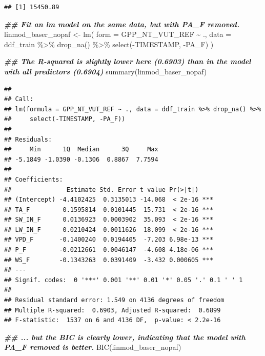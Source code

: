 \documentclass[
]{book}
\newenvironment{Shaded}{\begin{snugshade}}{\end{snugshade}}
\newcommand{\AttributeTok}[1]{\textcolor[rgb]{0.77,0.63,0.00}{#1}}
\newcommand{\DocumentationTok}[1]{\textcolor[rgb]{0.56,0.35,0.01}{\textbf{\textit{#1}}}}
\newcommand{\FunctionTok}[1]{\textcolor[rgb]{0.00,0.00,0.00}{#1}}
\newcommand{\NormalTok}[1]{#1}
\newcommand{\OtherTok}[1]{\textcolor[rgb]{0.56,0.35,0.01}{#1}}
\newcommand{\SpecialCharTok}[1]{\textcolor[rgb]{0.00,0.00,0.00}{#1}}
\begin{document}
\begin{verbatim}
## [1] 15450.89
\end{verbatim}

\begin{Shaded}
\begin{Highlighting}[]
\DocumentationTok{\#\# Fit an lm model on the same data, but with PA\_F removed.}
\NormalTok{linmod\_baser\_nopaf }\OtherTok{\textless{}{-}} \FunctionTok{lm}\NormalTok{(}
  \AttributeTok{form =}\NormalTok{ GPP\_NT\_VUT\_REF }\SpecialCharTok{\textasciitilde{}}\NormalTok{ ., }
  \AttributeTok{data =}\NormalTok{ ddf\_train }\SpecialCharTok{\%\textgreater{}\%} 
    \FunctionTok{drop\_na}\NormalTok{() }\SpecialCharTok{\%\textgreater{}\%} 
    \FunctionTok{select}\NormalTok{(}\SpecialCharTok{{-}}\NormalTok{TIMESTAMP, }\SpecialCharTok{{-}}\NormalTok{PA\_F)}
\NormalTok{)}

\DocumentationTok{\#\# The R{-}squared is slightly lower here (0.6903) than in the model with all predictors (0.6904)}
\FunctionTok{summary}\NormalTok{(linmod\_baser\_nopaf)}
\end{Highlighting}
\end{Shaded}

\begin{verbatim}
## 
## Call:
## lm(formula = GPP_NT_VUT_REF ~ ., data = ddf_train %>% drop_na() %>% 
##     select(-TIMESTAMP, -PA_F))
## 
## Residuals:
##     Min      1Q  Median      3Q     Max 
## -5.1849 -1.0390 -0.1306  0.8867  7.7594 
## 
## Coefficients:
##               Estimate Std. Error t value Pr(>|t|)    
## (Intercept) -4.4102425  0.3135013 -14.068  < 2e-16 ***
## TA_F         0.1595814  0.0101445  15.731  < 2e-16 ***
## SW_IN_F      0.0136923  0.0003902  35.093  < 2e-16 ***
## LW_IN_F      0.0210424  0.0011626  18.099  < 2e-16 ***
## VPD_F       -0.1400240  0.0194405  -7.203 6.98e-13 ***
## P_F         -0.0212661  0.0046147  -4.608 4.18e-06 ***
## WS_F        -0.1343263  0.0391409  -3.432 0.000605 ***
## ---
## Signif. codes:  0 '***' 0.001 '**' 0.01 '*' 0.05 '.' 0.1 ' ' 1
## 
## Residual standard error: 1.549 on 4136 degrees of freedom
## Multiple R-squared:  0.6903, Adjusted R-squared:  0.6899 
## F-statistic:  1537 on 6 and 4136 DF,  p-value: < 2.2e-16
\end{verbatim}

\begin{Shaded}
\begin{Highlighting}[]
\DocumentationTok{\#\# ... but the BIC is clearly lower, indicating that the model with PA\_F removed is better.}
\FunctionTok{BIC}\NormalTok{(linmod\_baser\_nopaf)}
\end{Highlighting}
\end{Shaded}
\end{document}
